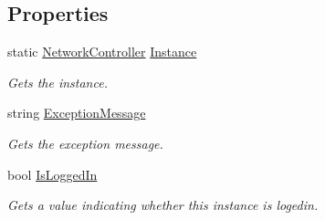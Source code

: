 \subsection*{Properties}
\begin{DoxyCompactItemize}
\item 
static \hyperlink{classClient_1_1Common_1_1Controllers_1_1NetworkController}{Network\-Controller} \hyperlink{classClient_1_1Common_1_1Controllers_1_1NetworkController_a24ad367082839e77f347f4a532d023ff}{Instance}
\begin{DoxyCompactList}\small\item\em Gets the instance. \end{DoxyCompactList}\item 
string \hyperlink{classClient_1_1Common_1_1Controllers_1_1NetworkController_a6a99e2fc6e8db9a23ad1f4477b5e0426}{Exception\-Message}
\begin{DoxyCompactList}\small\item\em Gets the exception message. \end{DoxyCompactList}\item 
bool \hyperlink{classClient_1_1Common_1_1Controllers_1_1NetworkController_afd2b5bdfc0da3720c3bbb257c0f73d94}{Is\-Logged\-In}
\begin{DoxyCompactList}\small\item\em Gets a value indicating whether this instance is logedin. \end{DoxyCompactList}\end{DoxyCompactItemize}


